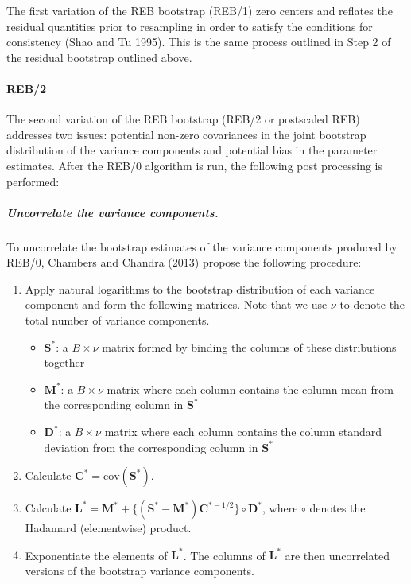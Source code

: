 The first variation of the REB bootstrap (REB/1) zero centers and reflates the residual quantities prior to resampling in order to satisfy the conditions for consistency (Shao and Tu 1995). This is the same process outlined in Step 2 of the residual bootstrap outlined above.

\hypertarget{reb2}{%
\paragraph{REB/2}\label{reb2}}

The second variation of the REB bootstrap (REB/2 or postscaled REB) addresses two issues: potential non-zero covariances in the joint bootstrap distribution of the variance components and potential bias in the parameter estimates. After the REB/0 algorithm is run, the following post processing is performed:

\hypertarget{uncorrelate-the-variance-components.}{%
\subparagraph{Uncorrelate the variance components.}\label{uncorrelate-the-variance-components.}}

To uncorrelate the bootstrap estimates of the variance components produced by REB/0, Chambers and Chandra (2013) propose the following procedure:

\begin{enumerate}
\def\labelenumi{\arabic{enumi}.}
\item
  Apply natural logarithms to the bootstrap distribution of each variance component and form the following matrices. Note that we use \(\nu\) to denote the total number of variance components.

  \begin{itemize}
  \tightlist
  \item
    \(\boldsymbol{S}^*\): a \(B \times \nu\) matrix formed by binding the columns of these distributions together
  \item
    \(\boldsymbol{M}^*\): a \(B \times \nu\) matrix where each column contains the column mean from the corresponding column in \(\boldsymbol{S}^*\)
  \item
    \(\boldsymbol{D}^*\): a \(B \times \nu\) matrix where each column contains the column standard deviation from the corresponding column in \(\boldsymbol{S}^*\)
  \end{itemize}
\item
  Calculate \(\boldsymbol{C}^*=\mathrm{cov} \left( \boldsymbol{S}^* \right)\).
\item
  Calculate \(\boldsymbol{L}^* = \boldsymbol{M}^* + \lbrace \left(\boldsymbol{S}^* - \boldsymbol{M}^*\right)\boldsymbol{C}^{*-1/2} \rbrace \circ \boldsymbol{D}^*\), where \(\circ\) denotes the Hadamard (elementwise) product.
\item
  Exponentiate the elements of \(\boldsymbol{L}^*\). The columns of \(\boldsymbol{L}^*\) are then uncorrelated versions of the bootstrap variance components.
\end{enumerate}

